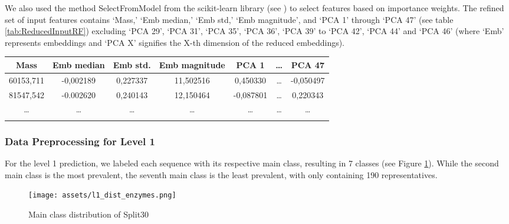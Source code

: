 \documentclass{bioinfo}
\begin{document}
\begin{methods}
We also used the method SelectFromModel from the scikit-learn library (see \cite{scikit-learn})
to select features based on importance weights. 
The refined set of input features contains 
‘Mass,’ ‘Emb median,’ ‘Emb std,’ ‘Emb magnitude’, and ‘PCA 1’ through ‘PCA 47’ (see table \ref{tab:ReducedInputRF}) excluding ‘PCA 29’, ‘PCA 31’, ‘PCA 35’,
‘PCA 36’, ‘PCA 39’ to ‘PCA 42’, ‘PCA 44’ and ‘PCA 46’ (where ‘Emb’ represents embeddings and ‘PCA X’ signifies the X-th dimension of the reduced embeddings).

\begin{table}[!htbp]
\setlength{\tabcolsep}{2pt}
 {
	\begin{tabular}{@{}ccccccc@{}}
		\toprule 
		Mass & Emb median & Emb std. & Emb magnitude & PCA 1 & \dots & PCA 47\\
		\midrule
		60153,711 & -0,002189 & 0,227337 & 11,502516 & 0,450330 & \dots & -0,050497\\
		81547,542 & -0.002620 & 0,240143 & 12,150464 & -0,087801 & \dots & 0,220343 \\
		\dots & \dots & \dots & \dots & \dots & \dots & \dots \\
		\botrule
    \end{tabular}
}{}
\end{table}

\subsubsection{Data Preprocessing for Level 1}
For the level 1 prediction, we labeled each sequence with its respective main class,
resulting in 7 classes (see Figure \ref{fig:l1_dist_train}).
While the second main class is the most prevalent, 
the seventh main class is the least prevalent, with only
containing 190 representatives.

\begin{figure}[!hb]
\texttt{[image: assets/l1\_dist\_enzymes.png]}
\caption{Main class distribution of Split30}\label{fig:l1_dist_train}
\end{figure}



\end{methods}
\end{document}
